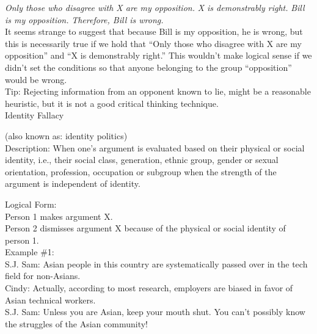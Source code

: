 \documentclass[a4paper,12pt,single,pdftex]{scrartcl}
\begin{document}
    
      {\em Only those who disagree with X are my opposition.} \newline
{\em X is demonstrably right.} \newline
{\em Bill is my opposition.} \newline
{\em Therefore, Bill is wrong.}
    \\

    
      It seems strange to suggest that because Bill is my opposition, he is wrong, but this is necessarily true if we hold that “Only those who disagree with X are my opposition” and “X is demonstrably right.” This wouldn’t make logical sense if we didn’t set the conditions so that anyone belonging to the group “opposition” would be wrong.
    \\

    
      Tip: Rejecting information from an opponent known to lie, might be a reasonable heuristic, but it is not a good critical thinking technique.
    \\

  

Identity Fallacy
    
      (also known as: identity politics)
    \\

  
    Description: When one's argument is evaluated based on their physical or social identity, i.e., their social class, generation, ethnic group, gender or sexual orientation, profession, occupation or subgroup when the strength of the argument is independent of identity.

    
      Logical Form:
    \\

    
      Person 1 makes argument X.
    \\

    
      Person 2 dismisses argument X because of the physical or social identity of person 1.
    \\

    
      Example \#1:
    \\

    
      S.J. Sam: Asian people in this country are systematically passed over in the tech field for non-Asians.
    \\

    
      Cindy: Actually, according to most research, employers are biased in favor of Asian technical workers.
    \\

    
      S.J. Sam: Unless you are Asian, keep your mouth shut. You can't possibly know the struggles of the Asian community!
    \\
\end{document}

